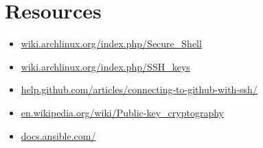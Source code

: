 \documentclass{beamer}
\begin{document}
\section{Resources}
\begin{frame}
  \begin{itemize}
    \item \href{https://wiki.archlinux.org/index.php/Secure\_Shell}{wiki.archlinux.org/index.php/Secure\_Shell}
    \item \href{https://wiki.archlinux.org/index.php/SSH\_keys}{wiki.archlinux.org/index.php/SSH\_keys}
    \item \href{https://help.github.com/articles/connecting-to-github-with-ssh/}{help.github.com/articles/connecting-to-github-with-ssh/}
    \item \href{https://en.wikipedia.org/wiki/Public-key\_cryptography}{en.wikipedia.org/wiki/Public-key\_cryptography}
    \item \href{https://docs.ansible.com/}{docs.ansible.com/}
  \end{itemize}
\end{frame}
\end{document}
